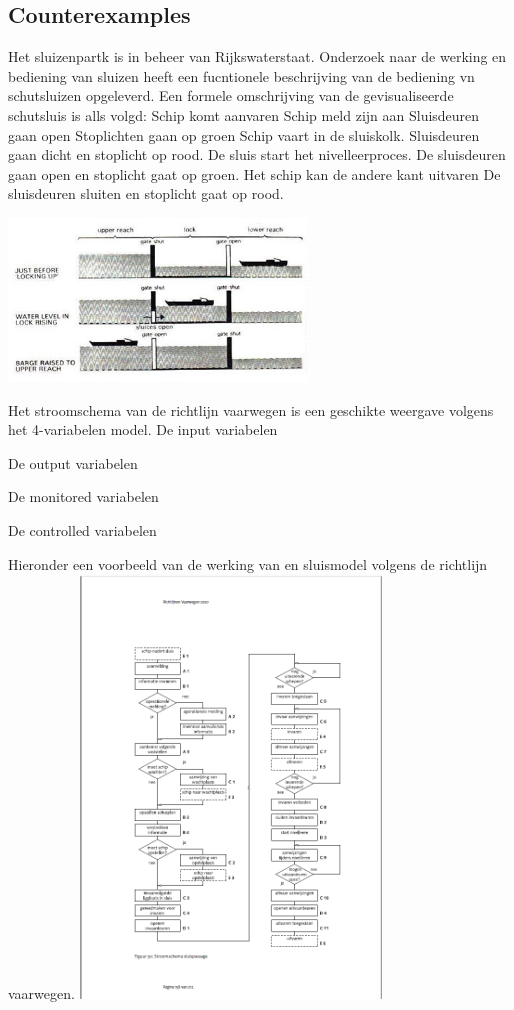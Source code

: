 \documentclass{article}
\begin{document}
	\subsection{Counterexamples}
	Het sluizenpartk is in beheer van Rijkswaterstaat. Onderzoek naar de werking en bediening van  sluizen
	heeft een fucntionele beschrijving van de bediening vn schutsluizen opgeleverd. Een formele omschrijving van de gevisualiseerde schutsluis is alls volgd:
	Schip komt aanvaren
	Schip meld zijn aan
	Sluisdeuren gaan open
	Stoplichten gaan op groen
	Schip vaart in de sluiskolk.
	Sluisdeuren gaan dicht en stoplicht op rood.
	De sluis start het nivelleerproces.
	De sluisdeuren  gaan open en stoplicht gaat op groen.
	Het schip kan de andere kant uitvaren
	De sluisdeuren sluiten en stoplicht gaat op rood.

 
	\includegraphics[width=8cm]{sluismodel.jpg} %
	
 Het stroomschema van de richtlijn vaarwegen is een geschikte weergave volgens het 4-variabelen model.
 De input variabelen
 
 De output variabelen
 
 De monitored variabelen
 
 De controlled variabelen
 
 
		Hieronder een voorbeeld van de werking van en sluismodel volgens de richtlijn vaarwegen.
	\includegraphics[width=8cm]{sluispassage.png} %
\end{document}
